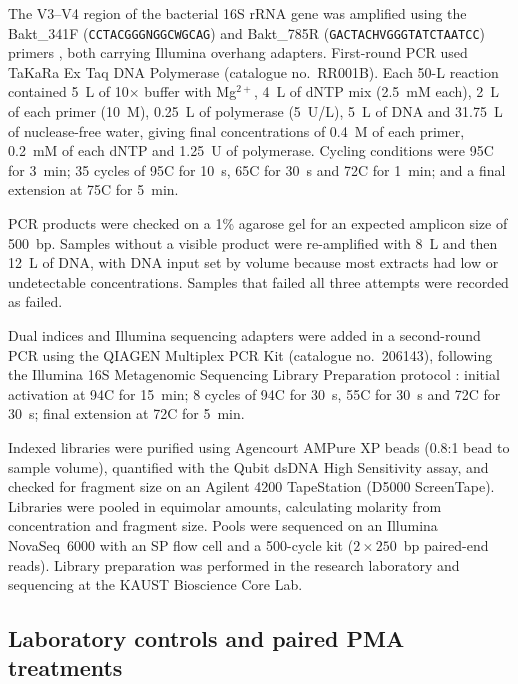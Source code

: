 \begin{revision}
The V3--V4 region of the bacterial 16S rRNA gene was amplified using
the Bakt\_341F (\texttt{CCTACGGGNGGCWGCAG}) and Bakt\_785R
(\texttt{GACTACHVGGGTATCTAATCC}) primers \cite{klindworth2013primers},
both carrying Illumina overhang adapters. First-round PCR used TaKaRa Ex Taq DNA Polymerase (catalogue no.\
RR001B). Each 50-\textmu L reaction contained
5~\textmu L of 10$\times$ buffer with Mg$^{2+}$, 4~\textmu L of dNTP mix
(2.5~mM each), 2~\textmu L of each primer (10~\textmu M), 0.25~\textmu L of polymerase (5~U/\textmu L), 5~\textmu L of DNA and 31.75~\textmu L of
nuclease-free water, giving final concentrations of 0.4~\textmu M of each
primer, 0.2~mM of each dNTP and 1.25~U of polymerase. Cycling conditions
were 95\degree C for 3~min; 35 cycles of 95\degree C for 10~s, 65\degree C
for 30~s and 72\degree C for 1~min; and a final extension at 75\degree C for 5~min.

PCR products were checked on a 1\% agarose gel for an expected amplicon size of 500~bp. Samples without a visible product were re-amplified with 8~\textmu L and then 12~\textmu L of DNA, with DNA input set by volume because most extracts had low or undetectable concentrations. Samples that failed all three attempts were recorded as failed.

Dual indices and Illumina sequencing adapters were added in a
second-round PCR using the QIAGEN Multiplex PCR Kit (catalogue no.\
206143), following the Illumina 16S Metagenomic Sequencing Library
Preparation protocol \cite{illumina16S}: initial activation at
94\degree C for 15~min; 8 cycles of 94\degree C for 30~s, 55\degree C
for 30~s and 72\degree C for 30~s; final extension at 72\degree C for
5~min.

Indexed libraries were purified using Agencourt AMPure XP beads (0.8:1 bead to sample volume), quantified with the Qubit dsDNA High Sensitivity assay, and checked for fragment size on an Agilent 4200 TapeStation (D5000 ScreenTape). Libraries were pooled in equimolar amounts, calculating molarity from concentration and fragment size. Pools were sequenced on an Illumina NovaSeq~6000 with an SP flow cell and a 500-cycle kit ($2 \times 250$~bp paired-end reads). Library preparation was performed in the research laboratory and sequencing at the KAUST Bioscience Core Lab.

\subsection{Laboratory controls and paired PMA treatments}



\end{revision}
